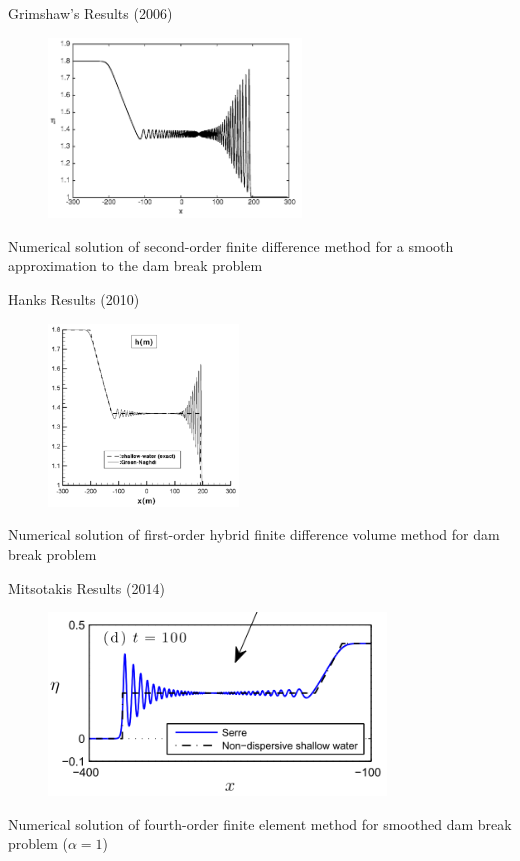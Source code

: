 \documentclass[pdf]{beamer}
\begin{document}


\begin{frame}{Grimshaw's Results (2006)}
	\begin{figure}
		\includegraphics[width=0.6\textwidth]{./Pictures/DSW/SmoothDBEl.png}
	\end{figure}
	Numerical solution of second-order finite difference method for a smooth approximation to the dam break problem
\end{frame}

\begin{frame}{Hanks Results (2010)}
	\begin{figure}
		\includegraphics[width=0.45\textwidth]{./Pictures/DSW/DBhankcut.png}
	\end{figure}
	Numerical solution of first-order hybrid finite difference volume method for dam break problem
\end{frame}

\begin{frame}{Mitsotakis Results (2014)}
	\begin{figure}
		\includegraphics[width=0.8\textwidth]{./Pictures/DSW/SmoothDBDutyhkcut.png}
	\end{figure}
	Numerical solution of fourth-order finite element method for smoothed dam break problem ($\alpha = 1$)
\end{frame}
\end{document}
